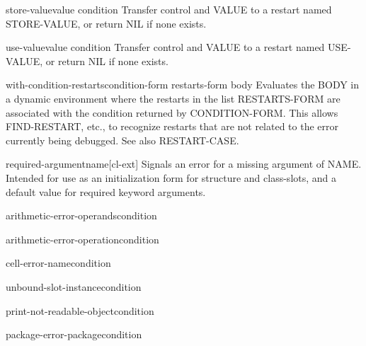 \documentclass[10pt,english]{book}
\begin{document}
\begin{function}{store-value}{value \op condition}
  Transfer control and VALUE to a restart named STORE-VALUE, or return NIL if
   none exists.
\end{function}

\begin{function}{use-value}{value \op condition}
  Transfer control and VALUE to a restart named USE-VALUE, or return NIL if
   none exists.
\end{function}

\begin{macro}{with-condition-restarts}{condition-form restarts-form \body body}
  Evaluates the BODY in a dynamic environment where the restarts in the list
   RESTARTS-FORM are associated with the condition returned by CONDITION-FORM.
   This allows FIND-RESTART, etc., to recognize restarts that are not related
   to the error currently being debugged. See also RESTART-CASE.
\end{macro}

\begin{function}{required-argument}{\op name}[cl-ext]
  Signals an error for a missing argument of NAME. Intended for
use as an initialization form for structure and class-slots, and
a default value for required keyword arguments.
\end{function}

\begin{function}{arithmetic-error-operands}{condition}
  
\end{function}

\begin{function}{arithmetic-error-operation}{condition}
  
\end{function}

\begin{function}{cell-error-name}{condition}
  
\end{function}

\begin{function}{unbound-slot-instance}{condition}
  
\end{function}

\begin{function}{print-not-readable-object}{condition}
  
\end{function}

\begin{function}{package-error-package}{condition}
  
\end{function}
\end{document}
